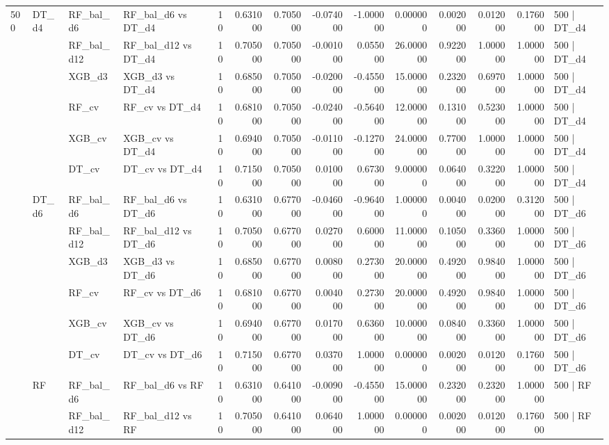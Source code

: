 \begin{tabular}{llllrrrrrrrrrl}
\cline{1-14} \cline{2-14}
\multirow[t]{18}{*}{500} & \multirow[t]{6}{*}{DT_d4} & RF_bal_d6 & RF_bal_d6 vs DT_d4 & 10 & 0.631000 & 0.705000 & -0.074000 & -1.000000 & 0.000000 & 0.002000 & 0.012000 & 0.176000 & 500 | DT_d4 \\
 &  & RF_bal_d12 & RF_bal_d12 vs DT_d4 & 10 & 0.705000 & 0.705000 & -0.001000 & 0.055000 & 26.000000 & 0.922000 & 1.000000 & 1.000000 & 500 | DT_d4 \\
 &  & XGB_d3 & XGB_d3 vs DT_d4 & 10 & 0.685000 & 0.705000 & -0.020000 & -0.455000 & 15.000000 & 0.232000 & 0.697000 & 1.000000 & 500 | DT_d4 \\
 &  & RF_cv & RF_cv vs DT_d4 & 10 & 0.681000 & 0.705000 & -0.024000 & -0.564000 & 12.000000 & 0.131000 & 0.523000 & 1.000000 & 500 | DT_d4 \\
 &  & XGB_cv & XGB_cv vs DT_d4 & 10 & 0.694000 & 0.705000 & -0.011000 & -0.127000 & 24.000000 & 0.770000 & 1.000000 & 1.000000 & 500 | DT_d4 \\
 &  & DT_cv & DT_cv vs DT_d4 & 10 & 0.715000 & 0.705000 & 0.010000 & 0.673000 & 9.000000 & 0.064000 & 0.322000 & 1.000000 & 500 | DT_d4 \\
\cline{2-14}
 & \multirow[t]{6}{*}{DT_d6} & RF_bal_d6 & RF_bal_d6 vs DT_d6 & 10 & 0.631000 & 0.677000 & -0.046000 & -0.964000 & 1.000000 & 0.004000 & 0.020000 & 0.312000 & 500 | DT_d6 \\
 &  & RF_bal_d12 & RF_bal_d12 vs DT_d6 & 10 & 0.705000 & 0.677000 & 0.027000 & 0.600000 & 11.000000 & 0.105000 & 0.336000 & 1.000000 & 500 | DT_d6 \\
 &  & XGB_d3 & XGB_d3 vs DT_d6 & 10 & 0.685000 & 0.677000 & 0.008000 & 0.273000 & 20.000000 & 0.492000 & 0.984000 & 1.000000 & 500 | DT_d6 \\
 &  & RF_cv & RF_cv vs DT_d6 & 10 & 0.681000 & 0.677000 & 0.004000 & 0.273000 & 20.000000 & 0.492000 & 0.984000 & 1.000000 & 500 | DT_d6 \\
 &  & XGB_cv & XGB_cv vs DT_d6 & 10 & 0.694000 & 0.677000 & 0.017000 & 0.636000 & 10.000000 & 0.084000 & 0.336000 & 1.000000 & 500 | DT_d6 \\
 &  & DT_cv & DT_cv vs DT_d6 & 10 & 0.715000 & 0.677000 & 0.037000 & 1.000000 & 0.000000 & 0.002000 & 0.012000 & 0.176000 & 500 | DT_d6 \\
\cline{2-14}
 & \multirow[t]{6}{*}{RF} & RF_bal_d6 & RF_bal_d6 vs RF & 10 & 0.631000 & 0.641000 & -0.009000 & -0.455000 & 15.000000 & 0.232000 & 0.232000 & 1.000000 & 500 | RF \\
 &  & RF_bal_d12 & RF_bal_d12 vs RF & 10 & 0.705000 & 0.641000 & 0.064000 & 1.000000 & 0.000000 & 0.002000 & 0.012000 & 0.176000 & 500 | RF \\

\end{tabular}
